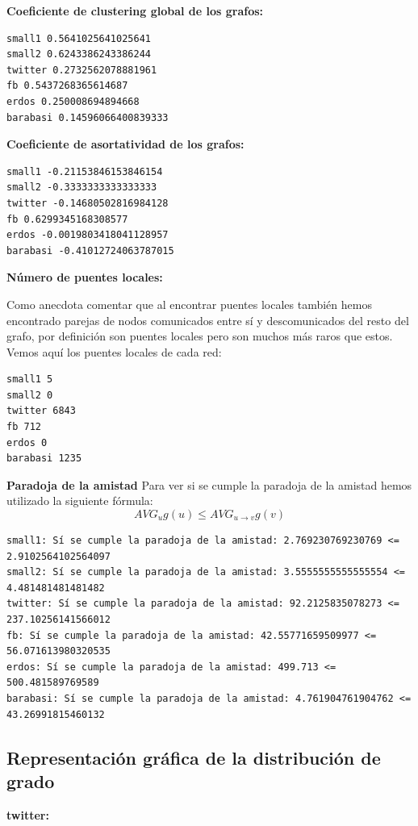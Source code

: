 \documentclass[palatino,nochap]{apuntes}
\begin{document}
\textbf{Coeficiente de clustering global de los grafos: }
\begin{verbatim}
small1 0.5641025641025641
small2 0.6243386243386244
twitter 0.2732562078881961
fb 0.5437268365614687
erdos 0.250008694894668
barabasi 0.14596066400839333
\end{verbatim}



\textbf{Coeficiente de asortatividad de los grafos: }
\begin{verbatim}
small1 -0.21153846153846154
small2 -0.3333333333333333
twitter -0.14680502816984128
fb 0.6299345168308577
erdos -0.0019803418041128957
barabasi -0.41012724063787015
\end{verbatim}


\textbf{Número de puentes locales: }

Como anecdota comentar que al encontrar puentes locales también hemos encontrado parejas de nodos comunicados entre sí y descomunicados del resto del grafo, por definición son puentes locales pero son muchos más raros que estos. Vemos aquí los puentes locales de cada red:
\begin{verbatim}
small1 5
small2 0
twitter 6843
fb 712
erdos 0
barabasi 1235
\end{verbatim}



\textbf{Paradoja de la amistad}
Para ver si se cumple la paradoja de la amistad hemos utilizado la siguiente fórmula:
$$ AVG_u g(u) \leq AVG_{u\rightarrow v}g(v) $$
\begin{verbatim}
small1: Sí se cumple la paradoja de la amistad: 2.769230769230769 <= 2.9102564102564097
small2: Sí se cumple la paradoja de la amistad: 3.5555555555555554 <= 4.481481481481482
twitter: Sí se cumple la paradoja de la amistad: 92.2125835078273 <= 237.10256141566012
fb: Sí se cumple la paradoja de la amistad: 42.55771659509977 <= 56.071613980320535
erdos: Sí se cumple la paradoja de la amistad: 499.713 <= 500.481589769589
barabasi: Sí se cumple la paradoja de la amistad: 4.761904761904762 <= 43.26991815460132
\end{verbatim}


\subsection{Representación gráfica de la distribución de grado }

\textbf{twitter:}
\end{document}
